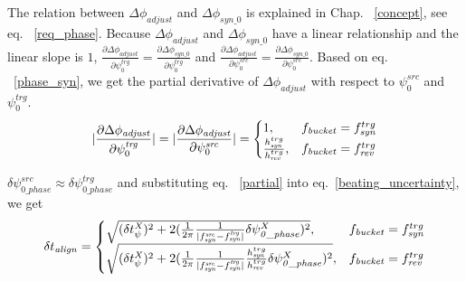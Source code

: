 \begin{itemize}
The relation between $\Delta \phi_\mathit{adjust}$ and $\Delta \phi_\mathit{syn\_0}$ is explained in Chap. ~\ref{concept}, see eq. ~\ref{req_phase}. Because $\Delta \phi_\mathit{adjust}$ and $\Delta \phi_\mathit{syn\_0}$ have a linear relationship and the linear slope is $1$, $\frac {\partial \Delta \phi_\mathit{adjust}}{\partial \psi^\mathit{trg}_0}=\frac {\partial \Delta \phi_\mathit{syn\_0}}{\partial \psi^\mathit{trg}_0}$ and $\frac {\partial \Delta \phi_\mathit{adjust}}{\partial \psi^\mathit{src}_0}=\frac {\partial \Delta \phi_\mathit{syn\_0}}{\partial \psi^\mathit{src}_0}$. Based on eq. ~\ref{phase_syn}, we get the partial derivative of $\Delta \phi_\mathit{adjust}$ with respect to $\psi^\mathit{src}_0$ and $\psi^\mathit{trg}_0$.
\begin{eqnarray}\label{partial}
|\frac {\partial \Delta \phi_\mathit{adjust}}{\partial \psi^\mathit{trg}_0}| = |\frac {\partial \Delta \phi_\mathit{adjust}}{\partial \psi^\mathit{src}_0}|=
\begin{cases}
1, &f_{\mathit{bucket}}=f_{\mathit{syn}}^{trg}\cr
\frac{h_{\mathit{syn}}^{trg}}{h_{\mathit{rev}}^{trg}}, &f_{\mathit{bucket}}=f_{\mathit{rev}}^{trg}\cr
\end{cases}
\end{eqnarray}

$\delta \psi^{src}_\mathit{0\_phase}\approx\delta \psi^{trg}_\mathit{0\_phase}$ and substituting eq. ~\ref{partial} into eq.~\ref{beating_uncertainty}, we get 
\begin{eqnarray}
\delta t_\mathit{align}=
\begin{cases}
\sqrt {(\delta t_\psi^\mathit{X})^2 +2(\frac{1}{2\pi}\frac{1}{|f_{\mathit{syn}}^\mathit{src}-f_{\mathit{syn}}^\mathit{trg}|} \delta \psi^{X}_\mathit{0\_phase})^2 }, &f_{\mathit{bucket}}=f_{\mathit{syn}}^{trg}\cr
\sqrt {(\delta t_\psi^\mathit{X})^2 +2(\frac{1}{2\pi}\frac{1}{|f_{\mathit{syn}}^\mathit{src}-f_{\mathit{syn}}^\mathit{trg}|} \frac{h_{\mathit{syn}}^{trg}}{h_{\mathit{rev}}^{trg}}\delta \psi^{X}_\mathit{0\_phase})^2 }, &f_{\mathit{bucket}}=f_{\mathit{rev}}^{trg}\cr
\end{cases}
\end{eqnarray}


\end{itemize}
